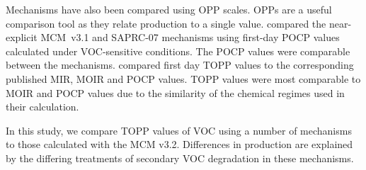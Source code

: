 Mechanisms have also been compared using OPP scales.
OPPs are a useful comparison tool as they relate  production to a single value. 
\citet{Derwent:2010} compared the near-explicit \mbox{MCM v3.1} and SAPRC-07 mechanisms using first-day POCP values calculated under VOC-sensitive conditions. 
The POCP values were comparable between the mechanisms.  
\citet{Butler:2011} compared first day TOPP values to the corresponding published MIR, MOIR and POCP values.
TOPP values were most comparable to MOIR and POCP values due to the similarity of the chemical regimes used in their calculation. 

In this study, we compare TOPP values of VOC using a number of mechanisms to those calculated with the MCM v3.2. 
Differences in  production are explained by the differing treatments of secondary VOC degradation in these mechanisms.
